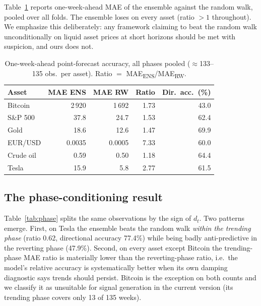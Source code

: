 \documentclass[11pt,a4paper]{article}
\begin{document}
Table~\ref{tab:mae} reports one-week-ahead MAE of the ensemble against the random walk, pooled over all folds. The ensemble loses on every asset (ratio $>1$ throughout). We emphasize this deliberately: any framework claiming to beat the random walk unconditionally on liquid asset prices at short horizons should be met with suspicion, and ours does not.

\begin{table}[H]
\centering\small
\caption{One-week-ahead point-forecast accuracy, all phases pooled ($\approx$133--135 obs.\ per asset). Ratio $=$ MAE\textsubscript{ENS}/MAE\textsubscript{RW}.}
\label{tab:mae}
\begin{tabular}{lrrrr}
\toprule
Asset & MAE ENS & MAE RW & Ratio & Dir.\ acc.\ (\%) \\
\midrule
Bitcoin & 2\,920 & 1\,692 & 1.73 & 43.0 \\
S\&P 500 & 37.8 & 24.7 & 1.53 & 62.4 \\
Gold & 18.6 & 12.6 & 1.47 & 69.9 \\
EUR/USD & 0.0035 & 0.0005 & 7.33 & 60.0 \\
Crude oil & 0.59 & 0.50 & 1.18 & 64.4 \\
Tesla & 15.9 & 5.8 & 2.77 & 61.5 \\
\bottomrule
\end{tabular}
\end{table}

\subsection{The phase-conditioning result}

Table~\ref{tab:phase} splits the same observations by the sign of $d_t$. Two patterns emerge. First, on Tesla the ensemble beats the random walk \emph{within the trending phase} (ratio 0.62, directional accuracy 77.4\%) while being badly anti-predictive in the reverting phase (47.9\%). Second, on every asset except Bitcoin the trending-phase MAE ratio is materially lower than the reverting-phase ratio, i.e.\ the model's relative accuracy is systematically better when its own damping diagnostic says trends should persist. Bitcoin is the exception on both counts and we classify it as unsuitable for signal generation in the current version (its trending phase covers only 13 of 135 weeks).
\end{document}
